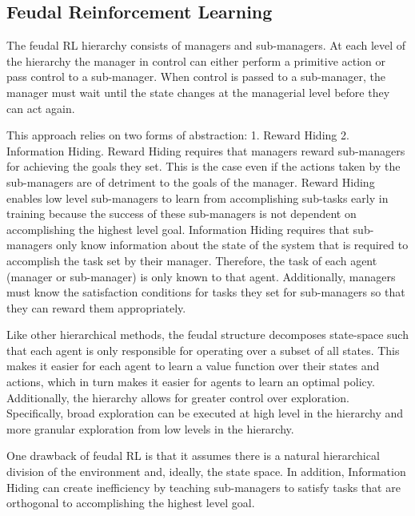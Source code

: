 \subsection{Feudal Reinforcement Learning}
The feudal RL \cite{Dayan} hierarchy consists of managers and sub-managers.
At each level of the hierarchy the manager in control can either perform
a primitive action or pass control to a sub-manager.
When control is passed to a sub-manager, the manager must wait until
the state changes at the managerial level before they can act again.

This approach relies on two forms of abstraction: 1. Reward Hiding 2. Information Hiding.
Reward Hiding requires that managers reward sub-managers for achieving the goals they set.
This is the case even if the actions taken by the sub-managers are of detriment to the goals of the manager.
Reward Hiding enables low level sub-managers to learn from accomplishing sub-tasks early in training
because the success of these sub-managers is not dependent on accomplishing the highest level goal.
Information Hiding requires that sub-managers only know information about the state of the system
that is required to accomplish the task set by their manager. Therefore, the task of each agent (manager or sub-manager)
is only known to that agent. Additionally, managers must know the satisfaction conditions for tasks they
set for sub-managers so that they can reward them appropriately.

Like other hierarchical methods, the feudal structure decomposes state-space such that each agent is
only responsible for operating over a subset of all states. This makes it easier for each agent to
learn a value function over their states and actions, which in turn makes it easier for agents to learn
an optimal policy. Additionally, the hierarchy allows for greater control over exploration. Specifically,
broad exploration can be executed at high level in the hierarchy and more granular exploration from low levels in the
hierarchy.

One drawback of feudal RL is that it assumes there is a natural hierarchical division of the environment and, ideally,
the state space. In addition, Information Hiding can create inefficiency by teaching sub-managers  to satisfy tasks
that are orthogonal to accomplishing the highest level goal.


